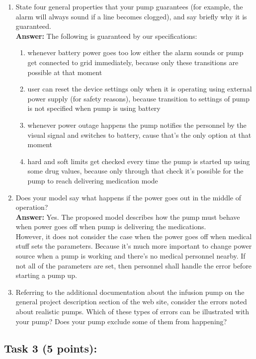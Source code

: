 \documentclass{article}
\newcommand{\head}{\subsection*}
\begin{document}
\begin{enumerate}
    \item State four general properties that your pump guarantees (for example, the alarm will always sound if a line becomes clogged), and say briefly why it is guaranteed. \\
    \textbf{Answer:} The following is guaranteed by our specifications:
    \begin{enumerate}
        \item whenever battery power goes too low either the alarm sounds or pump get connected to grid immediately, because only these transitions are possible at that moment
        \item user can reset the device settings only when it is operating using external power supply (for safety reasons), because transition to settings of pump is not specified when pump is using battery
        \item whenever power outage happens the pump notifies the personnel by the visual signal and switches to battery, cause that's the only option at that moment
        \item hard and soft limits get checked every time the pump is started up using some drug values, because only through that check it's possible for the pump to reach delivering medication mode 
    \end{enumerate}
    
    \item Does your model say what happens if the power goes out in the middle of operation? 
    \\
    \textbf{Answer:} Yes. The proposed model describes how the pump must behave when power goes off when pump is delivering the medications. 
    \\However, it does not consider the case when the power goes off when medical stuff sets the parameters. Because it's much more important to change power source when a pump is working and there's no medical personnel nearby. If not all of the parameters are set, then personnel shall handle the error before starting a pump up. 
    \item Referring to the additional documentation about the infusion pump on the general project description section of the web site, consider the errors noted about realistic pumps. Which of these types of errors can be illustrated with your pump? Does your pump exclude some of them from happening?

\end{enumerate}


\head{Task 3 (5 points):}
\end{document}
